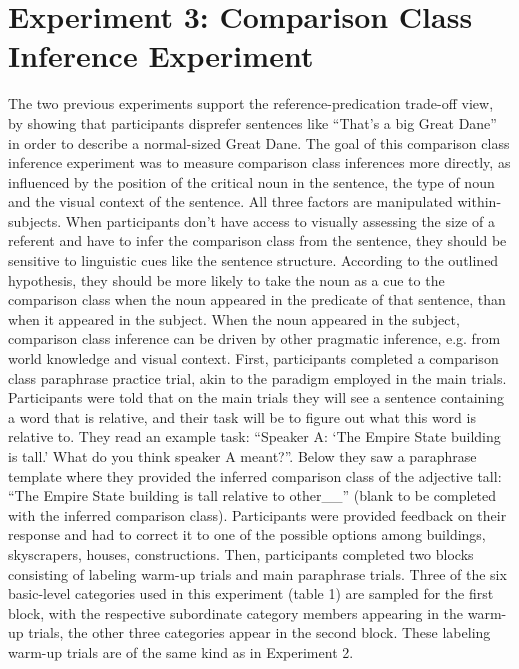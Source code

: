 \section{Experiment 3: Comparison Class Inference Experiment}
The two previous experiments support the reference-predication trade-off view, by showing that participants disprefer sentences like “That’s a big Great Dane” in order to describe a normal-sized Great Dane. The goal of this comparison class inference experiment was to measure comparison class inferences more directly, as influenced by the position of the critical noun in the sentence, the type of noun and the visual context of the sentence. All three factors are manipulated within-subjects.
When participants don’t have access to visually assessing the size of a referent and have to infer the comparison class from the sentence, they should be sensitive to linguistic cues like the sentence structure. According to the outlined hypothesis, they should be more likely to take the noun as a cue to the comparison class when the noun appeared in the predicate of that sentence, than when it appeared in the subject. When the noun appeared in the subject, comparison class inference can be driven by other pragmatic inference, e.g. from world knowledge and visual context. 
First, participants completed a comparison class paraphrase practice trial, akin to the paradigm employed in the main trials. Participants were told that on the main trials they will see a sentence containing a word that is relative, and their task will be to figure out what this word is relative to. They read an example task: “Speaker A: ‘The Empire State building is tall.’ What do you think speaker A meant?”. Below they saw a paraphrase template where they provided the inferred comparison class of the adjective tall: “The Empire State building is tall relative to other\_\_” (blank to be completed with the inferred comparison class). Participants were provided feedback on their response and had to correct it to one of the possible options among {buildings, skyscrapers, houses, constructions}. 
Then, participants completed two blocks consisting of labeling warm-up trials and main paraphrase trials. Three of the six basic-level categories used in this experiment (table 1) are sampled for the first block, with the respective subordinate category members appearing in the warm-up trials, the other three categories appear in the second block. These labeling warm-up trials are of the same kind as in Experiment 2. 
